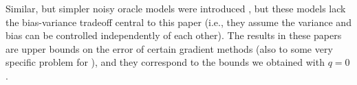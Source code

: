 Similar, but simpler noisy oracle models were introduced \citep{JN11a,Hon12,DvoGa15}, but these models lack the bias-variance tradeoff central to this paper (i.e., they assume the variance and bias can be controlled independently of each other). The results in these papers are upper bounds on the error of certain gradient methods (also to some very specific problem for \citealp{Hon12}), and they correspond to the bounds we obtained with $q=0$.



